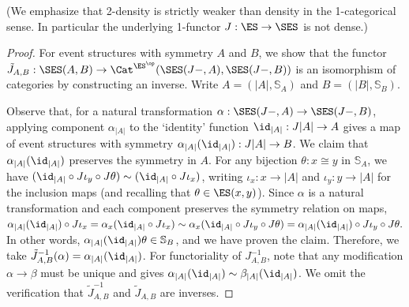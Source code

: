 (We emphasize that 2-density is strictly weaker than density in the 1-categorical sense. In particular the underlying 1-functor $J : \ES \to \SES$ is not dense.)
\begin{proof}
For event structures with symmetry $A$ and $B$, we show that the functor $\tilde{J}_{A ,B} : \SES(A, B) \to \Cat^{\ES^\op}(\SES(J-, A), \SES(J-, B))$ is an isomorphism of categories by constructing an inverse. Write $A = (|A|, \mathbb{S}_A)$ and $B = (|B|, \mathbb{S}_B)$. 

Observe that, for a natural transformation $\alpha : \SES(J-, A) \to \SES(J-, B)$, applying component $\alpha_{|A|}$ to the `identity' function $\id_{|A|} : J|A| \to A$ gives a map of event structures with symmetry $\alpha_{|A|}(\id_{|A|}) : J|A| \to B$. We claim that $\alpha_{|A|}(\id_{|A|})$ preserves the symmetry in $A$. For any bijection $\theta: x \cong y$ in $\mathbb{S}_A$, we have $(\id_{|A|} \circ J\iota_y \circ J\theta) \sim (\id_{|A|} \circ J\iota_x)$, writing $\iota_x : x \to |A|$ and $\iota_y : y \to |A|$ for the inclusion maps (and recalling that $\theta \in \ES(x, y)$). Since $\alpha$ is a natural transformation and each component preserves the symmetry relation on maps,  $\alpha_{|A|}(\id_{|A|}) \circ J{\iota_x} = \alpha_x (\id_{|A|} \circ J{\iota_x}) \sim \alpha_x(\id_{|A|} \circ J{\iota_y} \circ J\theta) = \alpha_{|A|}(\id_{|A|}) \circ J\iota_y \circ J\theta.$ In other words, $\alpha_{|A|}(\id_{|A|}) \theta \in \mathbb{S}_B$, and we have proven the claim. Therefore, we take $\tilde J_{A, B}^{-1}(\alpha) = \alpha_{|A|}(\id_{|A|})$. For functoriality of $J_{A, B}^{-1}$, note that any modification $\alpha \to \beta$ must be unique and gives $\alpha_{|A|}(\id_{|A|})\sim \beta_{|A|}(\id_{|A|})$. We omit the verification that $\tilde J_{A, B}^{-1}$ and $\tilde J_{A, B}$ are inverses. 
\end{proof}

